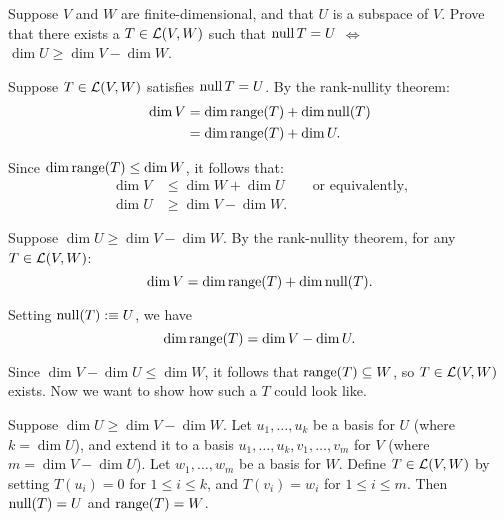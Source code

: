 \begin{xrcs}
  Suppose $V$ and $W$ are finite-dimensional, and that $U$ is a subspace of $V$. Prove that there exists a $T \in \mathcal{L}(V,W)$ such that $\operatorname{null} T = U$ $\iff$ $\dim U \geq \dim V - \dim W$.

  \begin{prf}
    \Rightarrowdirection Suppose $T \in \mathcal{L}(V,W)$ satisfies $\operatorname{null} T = U$. By the rank-nullity theorem:
    \begin{equation}
      \begin{aligned}
        \dim V &= \dim \operatorname{range}(T) + \dim \operatorname{null}(T) \\
        &= \dim \operatorname{range}(T) + \dim U.
      \end{aligned}
    \end{equation}

    Since $\dim \operatorname{range}(T) \leq \dim W$, it follows that:
    \begin{equation}
      \begin{aligned}
        \dim V &\leq \dim W + \dim U \qquad \text{or equivalently,}  \\
        \dim U &\geq \dim V - \dim W.
      \end{aligned}
    \end{equation}

    \Leftarrowdirection Suppose $\dim U \geq \dim V - \dim W$. By the rank-nullity theorem, for any $T \in \mathcal{L}(V,W)$:
    \begin{equation}
      \dim V = \dim \operatorname{range}(T) + \dim \operatorname{null}(T).
    \end{equation}

    Setting $\operatorname{null}(T) :\equiv U$, we have
    \begin{equation}
      \dim \operatorname{range}(T) = \dim V - \dim U.
    \end{equation}

    Since $\dim V - \dim U \leq \dim W$, it follows that $\operatorname{range}(T) \subseteq W$, so $T \in \mathcal{L} (V,W)$ exists. Now we want to show how such a $T$ could look like.

    Suppose $\dim U \geq \dim V - \dim W$. Let $u_1, \dots, u_k$ be a basis for $U$ (where $k = \dim U$), and extend it to a basis $u_1, \dots, u_k, v_1, \dots, v_m$ for $V$ (where $m = \dim V - \dim U$). Let $w_1, \dots, w_m$ be a basis for $W$. Define $T \in \mathcal{L}(V,W)$ by setting $T(u_i) = 0$ for $1 \leq i \leq k$, and $T(v_i) = w_i$ for $1 \leq i \leq m$. Then $\operatorname{null}(T) = U$ and $\operatorname{range}(T) = W$.
  \end{prf}
\end{xrcs}

